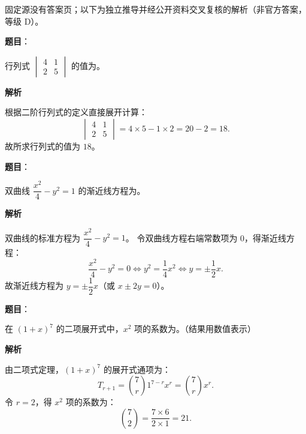 
\begin{gktip}
固定源没有答案页；以下为独立推导并经公开资料交叉复核的解析（非官方答案，等级 D）。
\end{gktip}


\begin{answer}

\textbf{题目}：

行列式 $\begin{vmatrix} 4 & 1 \\ 2 & 5 \end{vmatrix}$ 的值为\gkblank{}。

\textbf{解析}

根据二阶行列式的定义直接展开计算：
\nopagebreak[4]
\[\begin{vmatrix} 4 & 1 \\ 2 & 5 \end{vmatrix} = 4 \times 5 - 1 \times 2 = 20 - 2 = 18.\]
故所求行列式的值为 $18$。


\end{answer}
\begin{answer}

\textbf{题目}：

双曲线 $\dfrac{x^2}{4} - y^2 = 1$ 的渐近线方程为\gkblank{}。

\textbf{解析}

双曲线的标准方程为 $\dfrac{x^2}{4} - y^2 = 1$。
令双曲线方程右端常数项为 0，得渐近线方程：
\nopagebreak[4]
\[\frac{x^2}{4} - y^2 = 0 \iff y^2 = \frac{1}{4}x^2 \iff y = \pm \frac{1}{2}x.\]
故渐近线方程为 $y = \pm \dfrac{1}{2}x$（或 $x \pm 2y = 0$）。


\end{answer}
\begin{answer}

\textbf{题目}：

在 $(1 + x)^7$ 的二项展开式中，$x^2$ 项的系数为\gkblank{}。（结果用数值表示）

\textbf{解析}

由二项式定理，$(1 + x)^7$ 的展开式通项为：
\nopagebreak[4]
\[T_{r+1} = \binom{7}{r} 1^{7-r} x^r = \binom{7}{r} x^r.\]
令 $r = 2$，得 $x^2$ 项的系数为：
\nopagebreak[4]
\[\binom{7}{2} = \frac{7 \times 6}{2 \times 1} = 21.\]


\end{answer}
